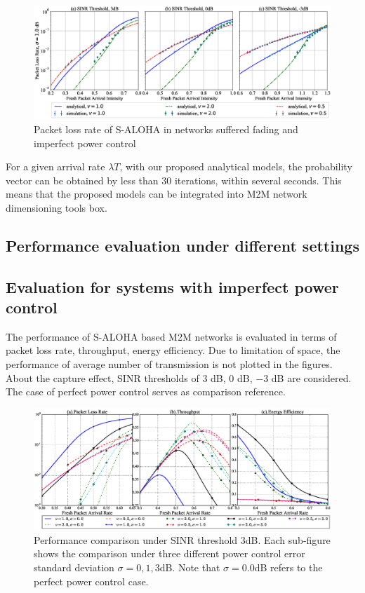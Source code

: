 \begin{figure}[!ht]
	\centering
	\includegraphics[width=1.0\linewidth]{Chapter4/Figures/packet_loss_rate_ci_with_fading_shadowing.eps}
	\caption{Packet loss rate of S-ALOHA in networks suffered fading and imperfect power control}
	\label{fig:ci_fading_shadowing}
\end{figure}

For a given arrival rate $\lambda T$, with our proposed analytical models, the probability vector can be obtained by less than $30$ iterations, within several seconds. This means that the proposed models can be integrated into M2M network dimensioning tools box.
\subsection{Performance evaluation under different settings}


\subsection{Evaluation for systems with imperfect power control}
The performance of S-ALOHA based M2M networks is evaluated in terms of packet loss rate, throughput, energy efficiency. Due to limitation of space, the performance of average number of transmission is not plotted in the figures. About the capture effect, SINR thresholds of $3$ dB, $0$ dB, $-3$ dB are considered. The case of perfect power control serves as comparison reference.
\begin{figure}[]
	\centering
	\includegraphics[width=1.0\linewidth]{Chapter4/Figures/shadowing_performance_case_3.0.eps}
	\caption{Performance comparison under SINR threshold $3$dB. Each sub-figure shows the comparison under three different power control error standard deviation $\sigma = 0, 1, 3$dB. Note that $\sigma=0.0$dB refers to the perfect power control case.}
	\label{fig:shadowing_performance}
\end{figure}

